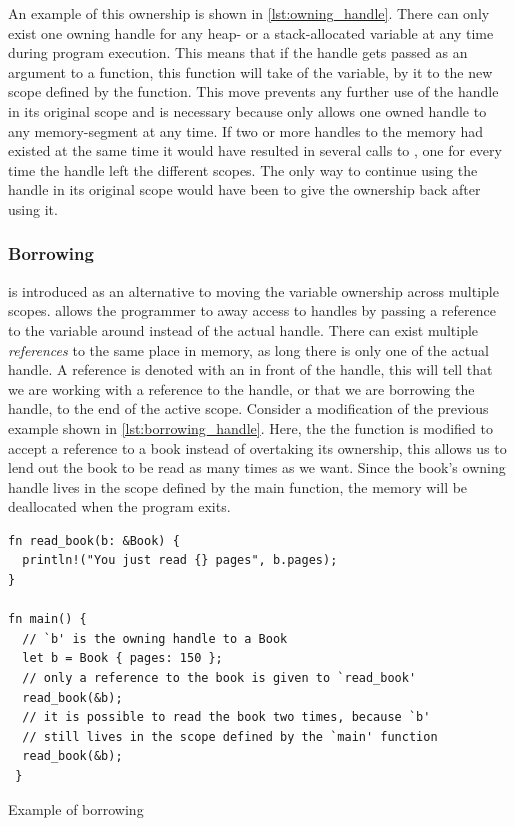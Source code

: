 An example of this ownership is shown in \autoref{lst:owning_handle}.
There can only exist one owning handle for any heap- or a stack-allocated variable at any time during program execution.
This means that if the handle gets passed as an argument to a function, this function will take  of the variable, by  it to the new scope defined by the function.
This move prevents any further use of the handle in its original scope and is necessary because {\rust} only allows one owned handle to any memory-segment at any time.
If two or more handles to the memory had existed at the same time it would have resulted in several calls to , one for every time the handle left the different scopes.
The only way to continue using the handle in its original scope would have been to give the ownership back after using it.

\subsubsection{Borrowing}
\label{ssec:borrowing}

 is introduced as an alternative to moving the variable ownership across multiple scopes.
{\rust} allows the programmer to  away access to handles by passing a reference to the variable around instead of the actual handle.
There can exist multiple \emph{references} to the same place in memory, as long there is only one  of the actual handle.
A reference is denoted with an \code{\&} in front of the handle, this will tell {\rust} that we are working with a reference to the handle, or that we are borrowing the handle, to the end of the active scope.
Consider a modification of the previous example shown in \autoref{lst:borrowing_handle}.
Here, the the  function is modified to accept a reference to a book instead of overtaking its ownership, this allows us to lend out the book to be read as many times as we want.
Since the book's owning handle lives in the scope defined by the main function, the memory will be deallocated when the program exits.

\begin{listing}[tb]
\begin{verbatim}
fn read_book(b: &Book) {
  println!("You just read {} pages", b.pages);
}

fn main() {
  // `b' is the owning handle to a Book
  let b = Book { pages: 150 };
  // only a reference to the book is given to `read_book'
  read_book(&b);
  // it is possible to read the book two times, because `b'
  // still lives in the scope defined by the `main' function
  read_book(&b);
 }
\end{verbatim}
\caption{Example of borrowing}
\label{lst:borrowing_handle}
\end{listing}

